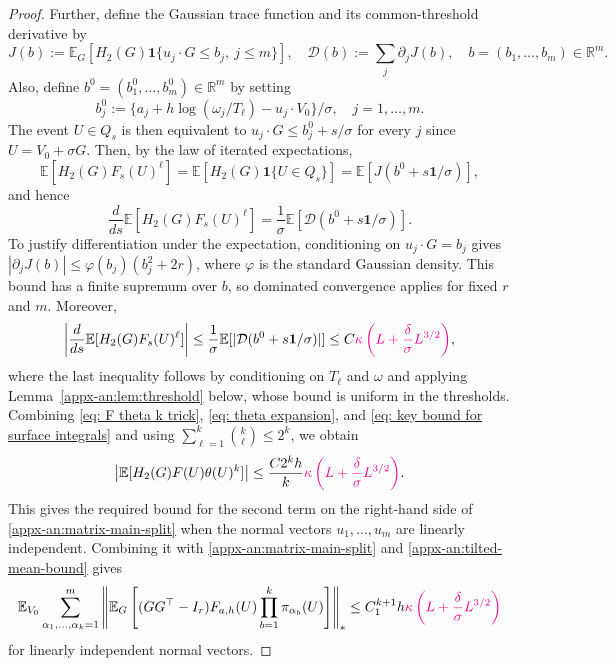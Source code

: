 \documentclass[11pt,letterpaper]{article}
\newcommand{\vSix}[1]{{\color{magenta}#1}}
\theoremstyle{remark}
\newcommand{\E}{\mathbb E}
\newcommand{\R}{\mathbb R}
\newcommand{\ind}{\mathbf 1}
\begin{document}
\begin{proof}
\begingroup
Further, define the
Gaussian trace function and its common-threshold derivative by
\begin{equation}
 J(b):=\E_G[H_2(G)\ind\{u_j\cdot G\le b_j,\ j\le m\}],
 \quad \mathcal D(b):=\sum_j\partial_jJ(b),\quad b=(b_1,\dots,b_m)\in\R^m.
 \label{appx-an:threshold-functions}
\end{equation}
Also, define $b^0 = (b_1^0,\dots,b_m^0)\in\R^m$ by setting
\[
 b_j^0:=\{a_j+h\log(\omega_j/T_\ell)-u_j\cdot V_0\}/\sigma,\quad j=1,\dots, m.
\]
The event \(U\in Q_s\) is then equivalent to
\(u_j\cdot G\le b_j^0+s/\sigma\) for every \(j\) since $U = V_0 + \sigma G$. 
Then, by the law of iterated expectations,
\[
 \E[H_2(G)F_s(U)^\ell] = \E[H_2(G)\ind\{U\in Q_s\}]
 =\E[J(b^0+s\mathbf1/\sigma)],
\]
and hence
\[
 \frac{d}{ds}\E[H_2(G)F_s(U)^\ell]
 =\frac1\sigma\E[\mathcal D(b^0+s\mathbf1/\sigma)].
\]
To justify differentiation under the expectation, conditioning on
$u_j\cdot G=b_j$ gives
$|\partial_jJ(b)|\le\varphi(b_j)(b_j^2+2r)$, where $\varphi$ is the
standard Gaussian density. This bound has a finite supremum over $b$,
so dominated convergence applies for fixed $r$ and $m$. Moreover,
\begin{equation}\label{eq: key bound for surface integrals}
 \left|\frac{d}{ds}\E[H_2(G)F_s(U)^\ell]\right|
 \le\frac1\sigma\E[|\mathcal D(b^0+s\mathbf1/\sigma)|]
 \le C\vSix{\kappa\left(L+\frac\delta\sigma L^{3/2}\right)},
\end{equation}
where the last inequality follows by conditioning on $T_\ell$ and
$\omega$ and applying Lemma~\ref{appx-an:lem:threshold} below, whose
bound is uniform in the thresholds. Combining \eqref{eq: F theta k trick}, \eqref{eq: theta expansion}, and \eqref{eq: key bound for surface integrals} and using
\(\sum_{\ell=1}^k\binom{k}{\ell}\le2^k\), we obtain
\[
 \left|\E[H_2(G)F(U)\theta(U)^k]\right|
 \le\frac{C2^kh}{k}
       \vSix{\kappa\left(L+\frac\delta\sigma L^{3/2}\right)}.
\]
This gives the required bound for the second term on the right-hand side of \eqref{appx-an:matrix-main-split} when the normal vectors $u_1,\dots, u_m$ are linearly independent. Combining it with \eqref{appx-an:matrix-main-split} and
\eqref{appx-an:tilted-mean-bound} gives
\begin{equation}
 \E_{V_0}\sum_{\alpha_1,\ldots,\alpha_k=1}^m
 \left\|\E_G\left[(GG^\top-I_r)F_{a,h}(U)
              \prod_{b=1}^k\pi_{\alpha_b}(U)\right]\right\|_*
 \le C_1^{k+1}h\vSix{\kappa\left(L+\frac\delta\sigma L^{3/2}\right)}
 \label{appx-an:matrix-bound-unsimplified}
\end{equation}
for linearly independent normal vectors.




\end{proof}
\end{document}
